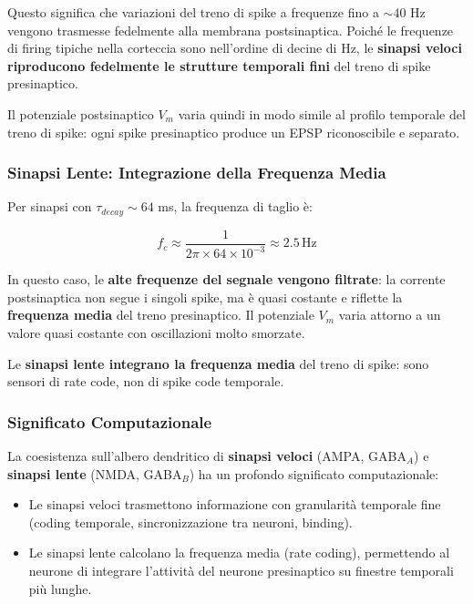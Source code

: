 Questo significa che variazioni del treno di spike a frequenze fino a $\sim 40$ Hz vengono trasmesse fedelmente alla membrana postsinaptica. Poiché le frequenze di firing tipiche nella corteccia sono nell'ordine di decine di Hz, le \textbf{sinapsi veloci riproducono fedelmente le strutture temporali fini} del treno di spike presinaptico.

Il potenziale postsinaptico $V_m$ varia quindi in modo simile al profilo temporale del treno di spike: ogni spike presinaptico produce un EPSP riconoscibile e separato.

\subsubsection{Sinapsi Lente: Integrazione della Frequenza Media}

Per sinapsi con $\tau_{decay} \sim 64$ ms, la frequenza di taglio è:

\begin{equation}
f_c \approx \frac{1}{2\pi \times 64 \times 10^{-3}} \approx 2.5 \, \text{Hz}
\end{equation}

In questo caso, le \textbf{alte frequenze del segnale vengono filtrate}: la corrente postsinaptica non segue i singoli spike, ma è quasi costante e riflette la \textbf{frequenza media} del treno presinaptico. Il potenziale $V_m$ varia attorno a un valore quasi costante con oscillazioni molto smorzate.

Le \textbf{sinapsi lente integrano la frequenza media} del treno di spike: sono sensori di rate code, non di spike code temporale.

\subsubsection{Significato Computazionale}

La coesistenza sull'albero dendritico di \textbf{sinapsi veloci} (AMPA, GABA$_A$) e \textbf{sinapsi lente} (NMDA, GABA$_B$) ha un profondo significato computazionale:

\begin{itemize}
    \item Le sinapsi veloci trasmettono informazione con granularità temporale fine (coding temporale, sincronizzazione tra neuroni, binding).
    \item Le sinapsi lente calcolano la frequenza media (rate coding), permettendo al neurone di integrare l'attività del neurone presinaptico su finestre temporali più lunghe.
\end{itemize}

